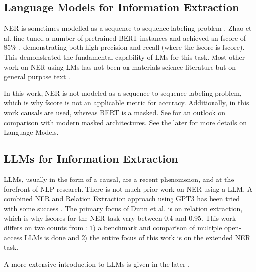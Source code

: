 \subsection{Language Models for Information Extraction}\label{sub:lmie}
\gls{NER} is sometimes modelled as a sequence-to-sequence labeling problem \cite{zhao_finetuning_2021, dunn_structured_2022}.
Zhao et al. fine-tuned a number of pretrained \gls{BERT} instances and achieved an \gls{fscore} of 85\% \cite{zhao_finetuning_2021}, demonstrating both high precision and recall (where the \gls{fscore} is \glsdesc{fscore}).
This demonstrated the fundamental capability of \glspl{LM} for this task.
Most other work on \gls{NER} using \glspl{LM} has not been on materials science literature but on general purpose text \cite{li_survey_2022}.


In this work, \gls{NER} is not modeled as a sequence-to-sequence labeling problem, which is why \gls{fscore} is not an applicable metric for accuracy.
Additionally, in this work \glspl{causal} are used, whereas \gls{BERT} is a \gls{masked}.
See  for an outlook on comparison with modern \gls{masked} architectures. See the later  for more details on Language Models.

\subsection{LLMs for Information Extraction}\label{sub:llmie}
\glspl{LLM}, usually in the form of a \gls{causal}, are a recent phenomenon, and at the forefront of \gls{NLP} research.
There is not much prior work on \gls{NER} using a \gls{LLM}.
A combined \gls{NER} and Relation Extraction approach using \gls{GPT3} has been tried with some success \cite{dunn_structured_2022}.
The primary focus of Dunn et al. \cite{dunn_structured_2022} is on relation extraction, which is why \glspl{fscore} for the \gls{NER} task vary between 0.4 and 0.95.
This work differs on two counts from \cite{dunn_structured_2022}: 1) a benchmark and comparison of multiple open-access \glspl{LLM} is done and 2) the entire focus of this work is on the extended \gls{NER} task.

A more extensive introduction to \glspl{LLM} is given in the later .

